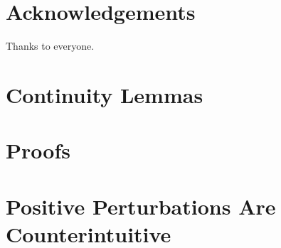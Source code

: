 \documentclass[11pt]{article}
\begin{document}
\section{Acknowledgements}
Thanks to everyone.






\clearpage
\newpage

\appendix
\section*{Continuity Lemmas}


\section*{Proofs}


\section*{Positive Perturbations Are Counterintuitive}

\end{document}
